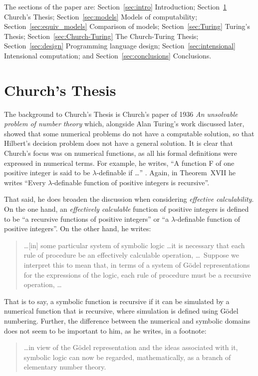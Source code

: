 \documentclass[a4paper]{article}
\begin{document}
The sections of the paper are: Section~\ref{sec:intro} Introduction;
Section~\ref{sec:Church} Church's Thesis; Section~\ref{sec:models}
Models of computability; Section~\ref{sec:equiv_models} Comparison of
models; Section~\ref{sec:Turing} Turing's Thesis;
Section~\ref{sec:Church-Turing} The Church-Turing Thesis;
Section~\ref{sec:design} Programming language design;
Section~\ref{sec:intensional} Intensional computation; and
Section~\ref{sec:conclusions} Conclusions.



\section{Church's Thesis} 
\label{sec:Church}

The background to Church's Thesis is Church's paper of 1936 {\em An
  unsolvable problem of number theory} \cite{Church36} which,
alongside Alan Turing's work discussed later, showed that some
numerical problems do not have a computable solution, so that Hilbert's
decision problem does not have a general solution.  It is clear that
Church's focus was on numerical functions, as all his formal
definitions were expressed in numerical terms. For example, he writes,
``A function F of one positive integer is said to be $\lambda$-definable if
\ldots'' \cite[page 349]{Church36}. Again, in Theorem~XVII he writes
``Every $\lambda$-definable function of positive integers is recursive''.



That said, he does broaden the discussion
when considering {\em effective calculability}. On the one hand, an
{\em effectively calculable} function of positive integers is defined
to be ``a recursive functions of positive integers'' or ``a
$\lambda$-definable function of positive integers''. On the other hand, he writes:
\begin{quote}
\ldots [in] some particular system of symbolic logic \ldots it is
necessary that each rule of procedure be an effectively calculable
operation, \ldots\ Suppose we
interpret this to mean that, in terms of a system of G\"odel
representations for the expressions of the logic, each rule of
procedure must be a recursive operation, \ldots
\end{quote}
That is to say, a symbolic function is recursive if it can be
simulated by a numerical function that is recursive, where simulation
is defined using G\"odel numbering.  Further, the difference between the
numerical and symbolic domains does not seem to be important to him,
as he writes, in a footnote:
\begin{quote}
  \ldots in view of the G\"odel representation and the ideas
  associated with it, symbolic logic can now be regarded,
  mathematically, as a branch of elementary number theory.
\end{quote}
\end{document}

